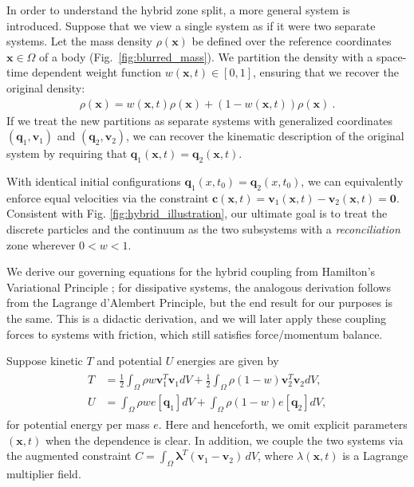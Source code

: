 In order to understand the hybrid zone split, a more general system is introduced. Suppose that we view a single system as if it were two separate systems. Let the mass density $\rho(\bm{x})$ be defined over
the reference coordinates $\mathbf{x} \in \Omega$ of a body (Fig.~\ref{fig:blurred_mass}). We partition the density
with a space-time dependent weight function $w(\bm{x},t) \in \left[0,1\right]$, ensuring that we recover the original density:
\begin{align}
  \rho\left(\mathbf{x}\right) = w\left(\mathbf{x},t\right) \rho\left(\mathbf{x}\right) + \left( 1 - w\left(\mathbf{x},t\right) \right) \rho\left(\mathbf{x}\right) \ .
\end{align}
If we treat the new partitions as separate systems with generalized coordinates
$(\mathbf{q}_1,\mathbf{v}_1)$ and $(\mathbf{q}_2,\mathbf{v}_2)$, we can recover the kinematic description of the
original system by requiring that $\mathbf{q}_1\left(\mathbf{x},t\right) = \mathbf{q}_2\left(\mathbf{x},t\right)$.

With identical initial configurations $\mathbf{q}_1\left( x, t_0 \right) = \mathbf{q}_2\left( x, t_0 \right)$, we can
equivalently enforce equal velocities via the constraint
$\mathbf{c}\left(\mathbf{x},t\right) = \mathbf{v}_1\left(\mathbf{x},t\right) - \mathbf{v}_2\left(\mathbf{x},t\right) = \mathbf{0}$.
Consistent with Fig. \ref{fig:hybrid_illustration}, our ultimate goal is to treat the discrete particles and the
continuum as the two subsystems with a \emph{reconciliation} zone wherever $0<w<1$.

We derive our governing equations for the hybrid coupling from Hamilton's Variational Principle \cite{Lanczos:2012}; for
dissipative systems, the analogous derivation follows from the Lagrange d'Alembert Principle, but the end result for our
purposes is the same. This is a didactic derivation, and we will later apply these coupling forces to systems with friction, which still satisfies force/momentum balance.

Suppose kinetic $T$ and potential $U$ energies are given by
\begin{align}
\begin{aligned}
T &= \frac{1}{2} \int_\Omega \rho w \bm{v}_1^T \bm{v}_1 dV + \frac{1}{2} \int_\Omega \rho (1-w) \bm{v}_2^T \bm{v}_2 dV, \\
U &= \int_\Omega \rho w e[\bm{q}_1] dV + \int_\Omega \rho (1-w) e[\bm{q}_2] dV,
\end{aligned}
\end{align}
for potential energy per mass $e$. Here and henceforth, we omit explicit parameters $\left(\mathbf{x},t\right)$ when the
dependence is clear. In addition, we couple the two systems via the augmented constraint
$C = \int_\Omega \bm{\lambda}^T (\bm{v}_1 - \bm{v}_2) \,dV$, where $\lambda\left(\mathbf{x},t\right)$ is a
Lagrange multiplier field.

